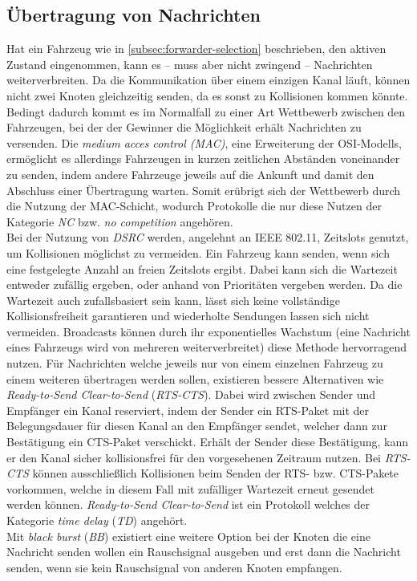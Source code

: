 \documentclass[english,runningheads,a4paper]{llncs}[2018/03/10]
\begin{document}
\subsection{Übertragung von Nachrichten}
Hat ein Fahrzeug wie in \ref{subsec:forwarder-selection} beschrieben, den aktiven Zustand eingenommen, kann es – muss aber nicht zwingend – Nachrichten weiterverbreiten.
Da die Kommunikation über einem einzigen Kanal läuft, können nicht zwei Knoten gleichzeitig senden, da es sonst zu Kollisionen kommen könnte.
Bedingt dadurch kommt es im Normalfall zu einer Art Wettbewerb zwischen den Fahrzeugen, bei der der Gewinner die Möglichkeit erhält Nachrichten zu versenden.
Die \textit{medium acces control (MAC)}, eine Erweiterung der OSI-Modells, ermöglicht es allerdings Fahrzeugen in kurzen zeitlichen Abständen voneinander zu senden, indem andere Fahrzeuge jeweils auf die Ankunft und damit den Abschluss einer Übertragung warten.
Somit erübrigt sich der Wettbewerb durch die Nutzung der MAC-Schicht, wodurch Protokolle die nur diese Nutzen der Kategorie \textit{NC} bzw. \textit{no competition} angehören.\\
Bei der Nutzung von \textit{DSRC} werden, angelehnt an IEEE 802.11, Zeitslots genutzt, um Kollisionen möglichst zu vermeiden.
Ein Fahrzeug kann senden, wenn sich eine festgelegte Anzahl an freien Zeitslots ergibt.
Dabei kann sich die Wartezeit entweder zufällig ergeben, oder anhand von Prioritäten vergeben werden.
Da die Wartezeit auch zufallsbasiert sein kann, lässt sich keine vollständige Kollisionsfreiheit garantieren und wiederholte Sendungen lassen sich nicht vermeiden.
Broadcasts können durch ihr exponentielles Wachstum (eine Nachricht eines Fahrzeugs wird von mehreren weiterverbreitet) diese Methode hervorragend nutzen.
Für Nachrichten welche jeweils nur von einem einzelnen Fahrzeug zu einem weiteren übertragen werden sollen, existieren bessere Alternativen wie \textit{Ready-to-Send Clear-to-Send} (\textit{RTS-CTS}).
Dabei wird zwischen Sender und Empfänger ein Kanal reserviert, indem der Sender ein RTS-Paket mit der Belegungsdauer für diesen Kanal an den Empfänger sendet, welcher dann zur Bestätigung ein CTS-Paket verschickt.
Erhält der Sender diese Bestätigung, kann er den Kanal sicher kollisionsfrei für den vorgesehenen Zeitraum nutzen.
Bei \textit{RTS-CTS} können ausschließlich Kollisionen beim Senden der RTS- bzw. CTS-Pakete vorkommen, welche in diesem Fall mit zufälliger Wartezeit erneut gesendet werden können.
\textit{Ready-to-Send Clear-to-Send} ist ein Protokoll welches der Kategorie \textit{time delay} (\textit{TD}) angehört.\\
Mit \textit{black burst} (\textit{BB}) existiert eine weitere Option bei der Knoten die eine Nachricht senden wollen ein Rauschsignal ausgeben und erst dann die Nachricht senden, wenn sie kein Rauschsignal von anderen Knoten empfangen\cite{conti2013mobile}.
\end{document}
